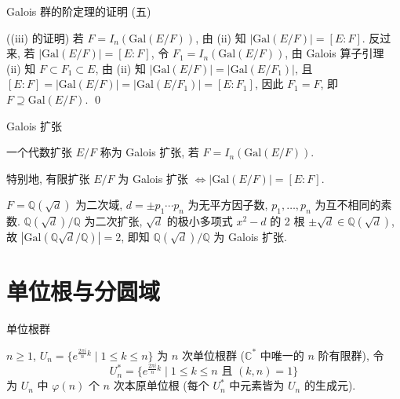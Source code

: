 
\begin{frame}{Galois 群的阶定理的证明 (五)}

\startproof[bg=yellow, fg=red]((iii) 的证明)
若 $F = I_n(\mathrm{Gal}(E/F))$, 由 (ii) 知
$|\mathrm{Gal}(E/F)| = [E:F]$.
反过来, 若 $|\mathrm{Gal}(E/F)| = [E:F]$, 令 $F_1 = I_n(\mathrm{Gal}(E/F))$,
由 Galois 算子引理 (ii) 知 $F \subset F_1 \subset E$,
由 (ii) 知 $|\mathrm{Gal}(E/F)| = |\mathrm{Gal}(E/F_1)|$,
且 $[E:F] = |\mathrm{Gal}(E/F)| = |\mathrm{Gal}(E/F_1)| = [E:F_1]$,
因此 $F_1 = F$, 即 $F \supseteq \mathrm{Gal}(E/F)$.
\qed

\end{frame}


\begin{frame}{Galois 扩张}

\begin{Def}[Galois 扩张]
一个代数扩张 $E/F$ 称为 Galois 扩张, 若 $F = I_n(\mathrm{Gal}(E/F))$.
\end{Def}

特别地, 有限扩张 $E/F$ 为 Galois 扩张
$\iff |\mathrm{Gal}(E/F)| = [E:F]$.

\pause

\begin{eg}
$F = \mathbb{Q}(\sqrt{d})$ 为二次域, $d = \pm p_1 \dotsm p_n$
为无平方因子数, $p_1, \dots, p_n$ 为互不相同的素数.
$\mathbb{Q}(\sqrt{d})/\mathbb{Q}$ 为二次扩张,
$\sqrt{d}$ 的极小多项式 $x^2 - d$ 的 2 根 $\pm\sqrt{d} \in \mathbb{Q}(\sqrt{d})$,
故 $|\mathrm{Gal}(\mathbb{Q}\sqrt{d}/\mathbb{Q})| = 2$,
即知 $\mathbb{Q}(\sqrt{d})/\mathbb{Q}$ 为 Galois 扩张.
\end{eg}

\end{frame}


\section[分圆]{单位根与分圆域}


\begin{frame}{单位根群}

\begin{eg}
$n \geq 1$,
$U_n = \{ e^{\frac{2 \pi i}{n} k} \mid 1 \leq k \leq n \}$
为 $n$ 次单位根群 ($\mathbb{C}^{*}$ 中唯一的 $n$ 阶有限群),
令
\[
U_n^{*} = \{ e^{\frac{2 \pi i}{n} k} \mid 1 \leq k \leq n \text{ 且 } (k, n) = 1 \}
\]
为 $U_n$ 中 $\varphi(n)$ 个 $n$ 次本原单位根
(每个 $U_n^{*}$ 中元素皆为 $U_n$ 的生成元).
\end{eg}

\end{frame}

